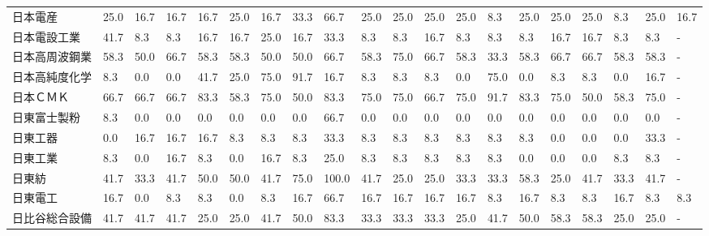 \documentclass[a4paper，11pt]{jsarticle}
\begin{document}
\begin{longtable}[c]{lp{3mm}p{3mm}p{3mm}p{3mm}p{3mm}p{3mm}p{3mm}p{3mm}p{3mm}p{3mm}p{3mm}p{3mm}p{3mm}p{3mm}p{3mm}p{3mm}p{3mm}p{3mm}p{3mm}}
日本電産            &   25.0 &   16.7 &      16.7 &      16.7 &       25.0 &   16.7 &   33.3 &   66.7 &    25.0 &    25.0 &   25.0 &  25.0 &    8.3 &    25.0 &    25.0 &  25.0 &   8.3 &  25.0 &  16.7 \\
日本電設工業          &   41.7 &    8.3 &       8.3 &      16.7 &       16.7 &   25.0 &   16.7 &   33.3 &     8.3 &     8.3 &   16.7 &   8.3 &    8.3 &     8.3 &    16.7 &  16.7 &   8.3 &   8.3 &     - \\
日本高周波鋼業         &   58.3 &   50.0 &      66.7 &      58.3 &       58.3 &   50.0 &   50.0 &   66.7 &    58.3 &    75.0 &   66.7 &  58.3 &   33.3 &    58.3 &    66.7 &  66.7 &  58.3 &  58.3 &     - \\
日本高純度化学         &    8.3 &    0.0 &       0.0 &      41.7 &       25.0 &   75.0 &   91.7 &   16.7 &     8.3 &     8.3 &    8.3 &   0.0 &   75.0 &     0.0 &     8.3 &   8.3 &   0.0 &  16.7 &     - \\
日本ＣＭＫ           &   66.7 &   66.7 &      66.7 &      83.3 &       58.3 &   75.0 &   50.0 &   83.3 &    75.0 &    75.0 &   66.7 &  75.0 &   91.7 &    83.3 &    75.0 &  50.0 &  58.3 &  75.0 &     - \\
日東富士製粉          &    8.3 &    0.0 &       0.0 &       0.0 &        0.0 &    0.0 &    0.0 &   66.7 &     0.0 &     0.0 &    0.0 &   0.0 &    0.0 &     0.0 &     0.0 &   0.0 &   0.0 &   0.0 &     - \\
日東工器            &    0.0 &   16.7 &      16.7 &      16.7 &        8.3 &    8.3 &    8.3 &   33.3 &     8.3 &     8.3 &    8.3 &   8.3 &    8.3 &     8.3 &     0.0 &   0.0 &   0.0 &  33.3 &     - \\
日東工業            &    8.3 &    0.0 &      16.7 &       8.3 &        0.0 &   16.7 &    8.3 &   25.0 &     8.3 &     8.3 &    8.3 &   8.3 &    8.3 &     0.0 &     0.0 &   0.0 &   8.3 &   8.3 &     - \\
日東紡             &   41.7 &   33.3 &      41.7 &      50.0 &       50.0 &   41.7 &   75.0 &  100.0 &    41.7 &    25.0 &   25.0 &  33.3 &   33.3 &    58.3 &    25.0 &  41.7 &  33.3 &  41.7 &     - \\
日東電工            &   16.7 &    0.0 &       8.3 &       8.3 &        0.0 &    8.3 &   16.7 &   66.7 &    16.7 &    16.7 &   16.7 &  16.7 &    8.3 &    16.7 &     8.3 &   8.3 &  16.7 &   8.3 &   8.3 \\
日比谷総合設備         &   41.7 &   41.7 &      41.7 &      25.0 &       25.0 &   41.7 &   50.0 &   83.3 &    33.3 &    33.3 &   33.3 &  25.0 &   41.7 &    50.0 &    58.3 &  58.3 &  25.0 &  25.0 &     - \\

\end{longtable}
\end{document}
